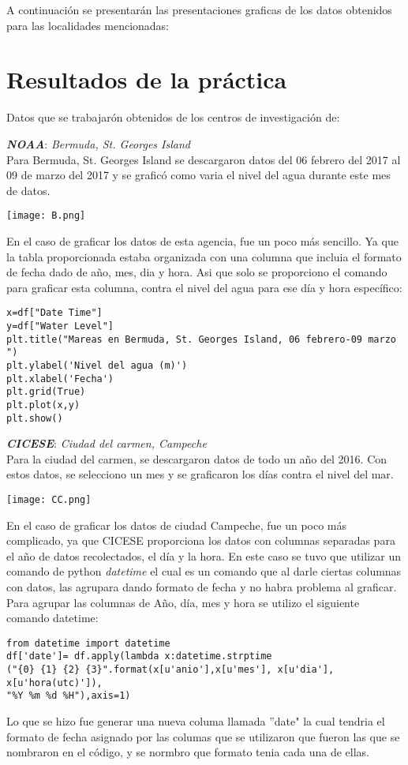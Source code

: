 \documentclass[12pt]{article}
\begin{document}
A continuación se presentarán las presentaciones graficas de los datos obtenidos para las localidades mencionadas:
\pagebreak
\section*{Resultados de la práctica}
Datos que se trabajarón obtenidos de los centros de investigación de:

\textbf{\textit{NOAA}}:  	
\textit{Bermuda, St. Georges Island} \\
Para Bermuda, St. Georges Island se descargaron datos del 06 febrero del 2017 al 09 de marzo del 2017 y se graficó como varia el nivel del agua durante este mes de datos. 
\begin{center}
\texttt{[image: B.png]}
\end{center}

En el caso de graficar los datos de esta agencia, fue un poco más sencillo. Ya que la tabla proporcionada estaba organizada con una columna que incluia el formato de fecha dado de año, mes, dia y hora. Asi que solo se proporciono el comando para graficar esta columna, contra el nivel del agua para ese día y hora específico:
\begin{verbatim}
x=df["Date Time"]
y=df["Water Level"]
plt.title("Mareas en Bermuda, St. Georges Island, 06 febrero-09 marzo ")
plt.ylabel('Nivel del agua (m)')
plt.xlabel('Fecha')
plt.grid(True)
plt.plot(x,y)
plt.show()
\end{verbatim}

\pagebreak
\textbf{\textit{CICESE}}: 
\textit{Ciudad del carmen, Campeche} \\
Para la ciudad del carmen, se descargaron datos de todo un año del 2016. Con estos datos, se selecciono un mes y se graficaron los días contra el nivel del mar.

\begin{center}
\texttt{[image: CC.png]}
\end{center}
En el caso de graficar los datos de ciudad Campeche, fue un poco más complicado, ya que CICESE proporciona los datos con columnas separadas para el año de datos recolectados, el día y la hora. En este caso se tuvo que utilizar un comando de python \textit{datetime} el cual es un comando que al darle ciertas columnas con datos, las agrupara dando formato de fecha y no habra problema al graficar. Para agrupar las columnas de Año, día, mes y hora se utilizo el siguiente comando datetime:
\begin{verbatim}
from datetime import datetime
df['date']= df.apply(lambda x:datetime.strptime
("{0} {1} {2} {3}".format(x[u'anio'],x[u'mes'], x[u'dia'], x[u'hora(utc)']),
"%Y %m %d %H"),axis=1)
\end{verbatim}
Lo que se hizo fue generar una nueva columa llamada ''date" la cual tendria el formato de fecha asignado por las columas que se utilizaron que fueron las que se nombraron en el código, y se normbro que formato tenia cada una de ellas. 
\end{document}
